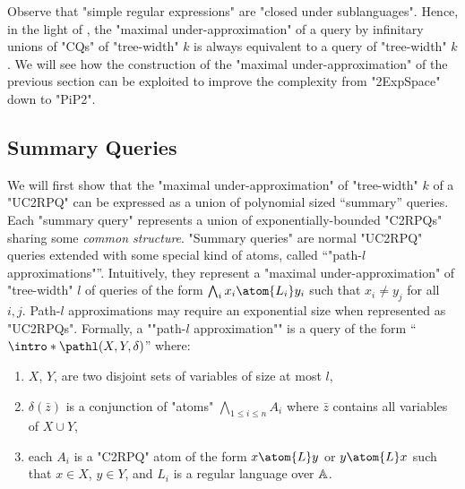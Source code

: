 Observe that "simple regular expressions" are "closed under sublanguages". Hence, in the light of
, the "maximal under-approximation" of a {\UCRPQSRE} query by infinitary unions of "CQs" of "tree-width" $k$ is always equivalent to a {\UCRPQSRE} query  of "tree-width" $k$. We will see how the construction of the "maximal under-approximation" of the previous section can be exploited to improve the complexity from "2ExpSpace" down to "PiP2".

\subsection{\AP{}Summary Queries}
We will first show that the "maximal under-approximation" of "tree-width" $k$ of a "UC2RPQ" can be expressed as a union of polynomial sized ``summary'' queries. Each "summary query" represents a union of exponentially-bounded "C2RPQs" sharing some \emph{common structure}. 
"Summary queries" are normal "UC2RPQ" queries extended with some special kind of atoms, called ``"path-$l$ approximations"''. 
Intuitively, they represent a "maximal under-approximation" of "tree-width" $l$ of queries of the form $\bigwedge_i x_i \atom{L_i} y_i$ such that $x_i \neq y_j$ for all $i,j$. 
Path-$l$ approximations may require an exponential size when represented as "UC2RPQs".
%
\AP Formally, a ""path-$l$ approximation"" is a query of the form ``$\intro*\pathl(X, Y, \delta)$''
where: 
\begin{enumerate}
	\item $X$, $Y$, are two disjoint sets of variables of size at most $l$, 
	\item $\delta(\bar z)$ is a conjunction of "atoms" $\bigwedge_{1 \leq i \leq n} A_i$ where $\bar z$ contains all variables of $X \cup Y$,
	\item each $A_i$ is a "C2RPQ" atom of the form $x \atom{L} y$ or $y \atom{L} x$  such that $x \in X$, $y \in Y$, and $L_i$ is a regular language over $\mathbb{A}$.
\end{enumerate}
